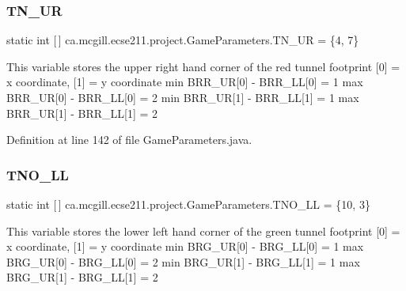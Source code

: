 \subsubsection{\texorpdfstring{T\+N\+\_\+\+UR}{TN\_UR}}
{\footnotesize\ttfamily  static  int \mbox{[}$\,$\mbox{]} ca.\+mcgill.\+ecse211.\+project.\+Game\+Parameters.\+T\+N\+\_\+\+UR = \{4, 7\}\hspace{0.3cm}{\ttfamily [static]}}

This variable stores the upper right hand corner of the red tunnel footprint \mbox{[}0\mbox{]} = x coordinate, \mbox{[}1\mbox{]} = y coordinate min B\+R\+R\+\_\+\+UR\mbox{[}0\mbox{]} -\/ B\+R\+R\+\_\+\+LL\mbox{[}0\mbox{]} = 1 max B\+R\+R\+\_\+\+UR\mbox{[}0\mbox{]} -\/ B\+R\+R\+\_\+\+LL\mbox{[}0\mbox{]} = 2 min B\+R\+R\+\_\+\+UR\mbox{[}1\mbox{]} -\/ B\+R\+R\+\_\+\+LL\mbox{[}1\mbox{]} = 1 max B\+R\+R\+\_\+\+UR\mbox{[}1\mbox{]} -\/ B\+R\+R\+\_\+\+LL\mbox{[}1\mbox{]} = 2 

Definition at line 142 of file Game\+Parameters.\+java.

\mbox{\label{enumca_1_1mcgill_1_1ecse211_1_1project_1_1_game_parameters_a951a1759354ae42a5030e36100f553bc}} 
\subsubsection{\texorpdfstring{T\+N\+O\+\_\+\+LL}{TNO\_LL}}
{\footnotesize\ttfamily  static  int \mbox{[}$\,$\mbox{]} ca.\+mcgill.\+ecse211.\+project.\+Game\+Parameters.\+T\+N\+O\+\_\+\+LL = \{10, 3\}\hspace{0.3cm}{\ttfamily [static]}}

This variable stores the lower left hand corner of the green tunnel footprint \mbox{[}0\mbox{]} = x coordinate, \mbox{[}1\mbox{]} = y coordinate min B\+R\+G\+\_\+\+UR\mbox{[}0\mbox{]} -\/ B\+R\+G\+\_\+\+LL\mbox{[}0\mbox{]} = 1 max B\+R\+G\+\_\+\+UR\mbox{[}0\mbox{]} -\/ B\+R\+G\+\_\+\+LL\mbox{[}0\mbox{]} = 2 min B\+R\+G\+\_\+\+UR\mbox{[}1\mbox{]} -\/ B\+R\+G\+\_\+\+LL\mbox{[}1\mbox{]} = 1 max B\+R\+G\+\_\+\+UR\mbox{[}1\mbox{]} -\/ B\+R\+G\+\_\+\+LL\mbox{[}1\mbox{]} = 2 

